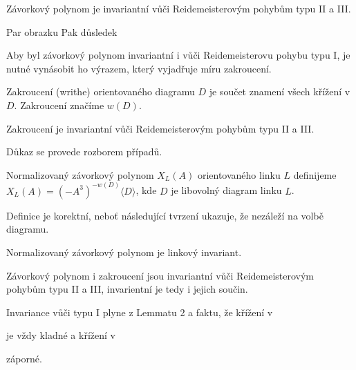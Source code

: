 \begin{tvrz}
Závorkový polynom je invariantní vůči Reidemeisterovým pohybům typu II a III.
\end{tvrz}
\begin{dukaz}
Par obrazku
Pak důsledek
\end{dukaz}

Aby byl závorkový polynom invariantní i vůči Reidemeisterovu pohybu typu I, je nutné vynásobit ho výrazem, který vyjadřuje míru zakroucení.

\begin{definice}
Zakroucení (writhe) orientovaného diagramu $D$ je součet znamení všech křížení v $D$. Zakroucení značíme $w(D)$.
\end{definice}

\begin{lemma}
Zakroucení je invariantní vůči Reidemeisterovým pohybům typu II a III.
\end{lemma}
\begin{dukaz}
Důkaz se provede rozborem případů.
\end{dukaz}

\begin{definice}
Normalizovaný závorkový polynom $X_L(A)$ orientovaného linku $L$ definijeme $X_L(A) = (-A^3)^{-w(D)}\langle D \rangle$, kde $D$ je libovolný diagram linku $L$.
\end{definice}

Definice je korektní, neboť následující tvrzení ukazuje, že nezáleží na volbě diagramu.

\begin{tvrz}
Normalizovaný závorkový polynom je linkový invariant.
\end{tvrz}
\begin{dukaz}
Závorkový polynom i zakroucení jsou invariantní vůči Reidemeisterovým pohybům typu II a III, invarientní je tedy i jejich součin.

Invariance vůči typu I plyne z Lemmatu 2 a faktu, že křížení v  
je vždy kladné a křížení v 
 záporné.
\end{dukaz}

